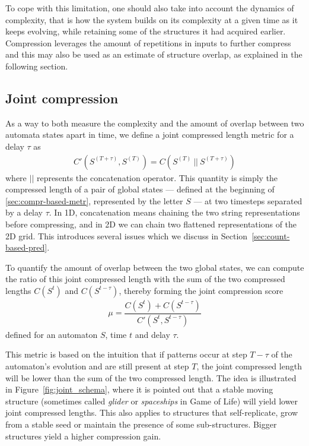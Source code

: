 To cope with this limitation, one should also take into account the dynamics of
complexity, that is how the system builds on its complexity at a given time as
it keeps evolving, while retaining some of the structures it had acquired
earlier. Compression leverages the amount of repetitions in inputs to further
compress and this may also be used as an estimate of structure overlap, as
explained in the following section.

\subsection{Joint compression}\label{sec:joint-compression}

As a way to both measure the complexity and the amount of overlap between two
automata states apart in time, we define a joint compressed length metric for a
delay $\tau$ as
\begin{align}
  C'\left(S^{(T + \tau)}, S^{(T)}\right) =
  C\left(S^{(T)}\ ||\ S^{(T + \tau)}\right)
\end{align}
where $||$ represents the concatenation operator. This quantity is simply the
compressed length of a pair of global states --- defined at the beginning of
\ref{sec:compr-based-metr}, represented by the letter $S$ --- at two timesteps
separated by a delay $\tau$. In 1D, concatenation means chaining the two string
representations before compressing, and in 2D we can chain two flattened
representations of the 2D grid. This introduces several issues which we discuss
in Section~\ref{sec:count-based-pred}.

To quantify the amount of overlap between the two global states, we can compute
the ratio of this joint compressed length with the sum of the two compressed
lengths $C(S^t)$ and $C(S^{t-\tau})$, thereby forming the joint compression
score
\begin{align}
  \mu = \dfrac{C\left( S^t \right) +
  C\left( S^{t - \tau} \right)}{C'\left( S^t, S^{t - \tau} \right)}
\end{align}
defined for an automaton $S$, time $t$ and delay $\tau$.

This metric is based on the intuition that if patterns occur at step $T - \tau$
of the automaton's evolution and are still present at step $T$, the joint
compressed length will be lower than the sum of the two compressed length. The
idea is illustrated in Figure~\ref{fig:joint_schema}, where it is pointed out
that a stable moving structure (sometimes called \emph{glider} or
\emph{spaceships} in Game of Life) will yield lower joint compressed lengths.
This also applies to structures that self-replicate, grow from a stable seed or
maintain the presence of some sub-structures. Bigger structures yield a higher
compression gain.

